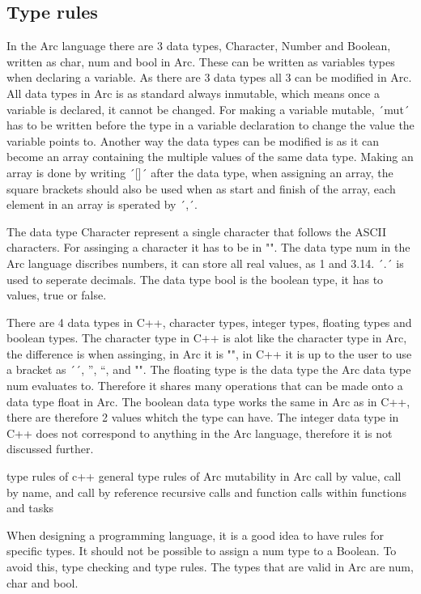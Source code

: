 \subsection{Type rules}\label{subsec:typerules}
In the Arc language there are 3 data types, Character, Number and Boolean, written as char, num and bool in Arc. These can be written as variables types when declaring a variable. As there are 3 data types all 3 can be modified in Arc. All data types in Arc is as standard always inmutable, which means once a variable is declared, it cannot be changed. For making a variable mutable, ´mut´ has to be written before the type in a variable declaration to change the value the variable points to. Another way the data types can be modified is as it can become an array containing the multiple values of the same data type. Making an array is done by writing ´[]´ after the data type, when assigning an array, the square brackets should also be used when as start and finish of the array, each element in an array is sperated by ´,´.

The data type Character represent a single character that follows the ASCII characters. For assinging a character it has to be in "". The data type num in the Arc language discribes numbers, it can store all real values, as 1 and 3.14. ´.´ is used to seperate decimals. The data type bool is the boolean type, it has to values, true or false.


There are 4 data types in C++, character types, integer types, floating types and boolean types. The character type in C++ is alot like the character type in Arc, the difference is when assinging, in Arc it is "", in C++ it is up to the user to use a bracket as ´´, '', ``, and "". The floating type is the data type the Arc data type num evaluates to. Therefore it shares many operations that can be made onto a data type float in Arc. The boolean data type works the same in Arc as in C++, there are therefore 2 values whitch the type can have. The integer data type in C++ does not correspond to anything in the Arc language, therefore it is not discussed further.


type rules of c++
general type rules of Arc
mutability in Arc
call by value, call by name, and call by reference
recursive calls and function calls within functions and tasks

When designing a programming language, it is a good idea to have rules for specific types. It should not be possible to assign a num type to a Boolean. To avoid this, type checking and type rules. The types that are valid in Arc are num, char and bool.

